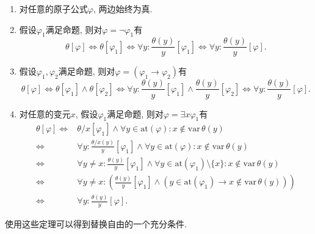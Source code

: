 \documentclass[UTF8]{ctexart}
\begin{document}
\begin{enumerate}
    \item 对任意的原子公式$\varphi$, 两边始终为真.
    
    \item 假设$\varphi_1$满足命题, 则对$\varphi=\neg\varphi_1$有
    \[
        \theta[\varphi]\iff\theta[\varphi_1]\iff
        \forall y:\frac{\theta(y)}{y}[\varphi_1]\iff
        \forall y:\frac{\theta(y)}{y}[\varphi].
    \]

    \item 假设$\varphi_1,\varphi_2$满足命题, 则对$\varphi=(\varphi_1\to\varphi_2)$有
    \[
        \theta[\varphi]\iff\theta[\varphi_1]\land\theta[\varphi_2]\iff
        \forall y:\frac{\theta(y)}{y}[\varphi_1]\land\frac{\theta(y)}{y}[\varphi_2]
        \iff\forall y:\frac{\theta(y)}{y}[\varphi].
    \]

    \item 对任意的变元$x$, 假设$\varphi_1$满足命题,
    则对$\varphi=\exists x\varphi_1$有
    \vspace{3pt}
    \begin{equation*}\begin{aligned}
        \theta[\varphi]\iff&\theta/x[\varphi_1]\land
        \forall y\in\mathrm{at}(\varphi):x\notin\mathrm{var}\,\theta(y)\\
        \iff&\forall y:\frac{\theta/x(y)}{y}[\varphi_1]\land
        \forall y\in\mathrm{at}(\varphi):x\notin\mathrm{var}\,\theta(y)\\
        \iff&\forall y\neq x:\frac{\theta(y)}{y}[\varphi_1]\land
        \forall y\in\mathrm{at}(\varphi_1)\setminus\{x\}:
        x\notin\mathrm{var}\,\theta(y)\\
        \iff&\forall y\neq x:\left(\frac{\theta(y)}{y}[\varphi_1]\land
        (y\in\mathrm{at}(\varphi_1)\to x\notin\mathrm{var}\,\theta(y))\right)\\
        \iff&\forall y:\frac{\theta(y)}{y}[\varphi].
    \end{aligned}\tag*{\qedsymbol}\end{equation*}
\end{enumerate}


\vspace{10pt}

使用这些定理可以得到替换自由的一个充分条件.

\end{document}
